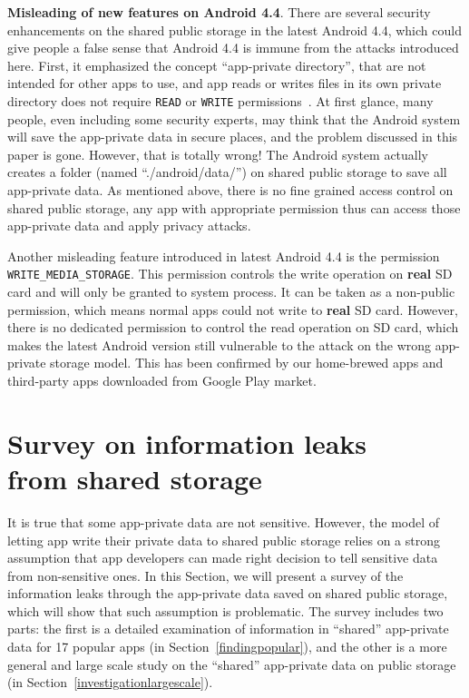 \documentclass{sig-alternate}
\begin{document}
\textbf{Misleading of new features on Android 4.4}. There are several security enhancements on the shared public storage in the latest Android 4.4, which could give people a false sense that Android 4.4 is immune from the attacks introduced here. First, it emphasized the concept ``app-private directory'', that are not intended for other apps to use, and app reads or writes files in its own private directory does not require \texttt{READ} or \texttt{WRITE} permissions~\cite{androiddocumentexternal}. At first glance, many people, even including some security experts, may think that the Android system will save the app-private data in secure places, and the problem discussed in this paper is gone. However, that is totally wrong! The Android system actually creates a folder (named ``./android/data/'') on shared public storage to save all app-private data. As mentioned above, there is no fine grained access control on shared public storage, any app with appropriate permission thus can access those app-private data and apply privacy attacks.

Another misleading feature introduced in latest Android 4.4 is the permission \texttt{WRITE\_MEDIA\_STORAGE}. This permission controls the write operation on \textbf{real} SD card and will only be granted to system process. It can be taken as a non-public permission, which means normal apps could not write to \textbf{real} SD card.  However, there is no dedicated permission to control the read operation on SD card, which makes the latest Android version still vulnerable to the attack on the wrong app-private storage model. This has been confirmed by our home-brewed apps and third-party apps downloaded from Google Play market.

\section{Survey on information leaks \\from shared storage}
\label{sec:survey}

It is true that some app-private data are not sensitive. However, the model of letting app write their private data to shared public storage relies on a strong assumption that app developers can made right decision to tell sensitive data from non-sensitive ones. In this Section, we will present a survey of the information leaks through the app-private data saved on shared public storage, which will show that such assumption is problematic. The survey includes two parts: the first is a detailed examination of information in ``shared'' app-private data for 17 popular apps (in Section~\ref{findingpopular}), and the other is a more general and large scale study on the ``shared'' app-private data on public storage (in Section~\ref{investigationlargescale}).
\end{document}
